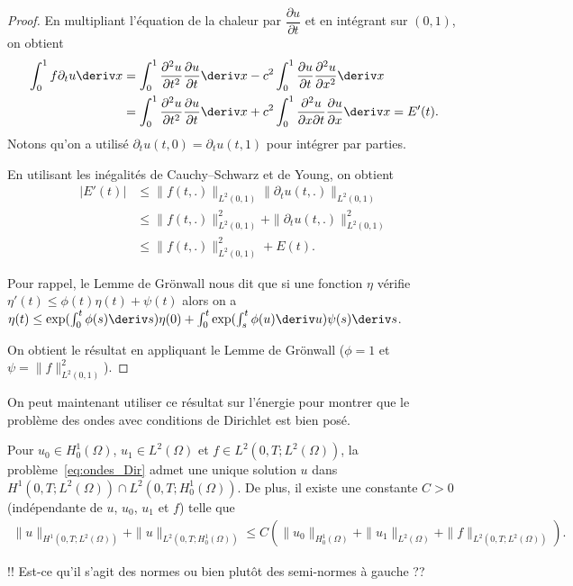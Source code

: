 \documentclass[12pt,a4paper,twoside]{article}
\begin{document}
\begin{proof}
  En multipliant l'\'equation de la chaleur par $\dfrac{\partial u}{\partial t}$
  et en int\'egrant sur $(0,1)$, on obtient
  \begin{align*}
    \int_0^1 f \partial_t u \deriv x
    &=
    \int_0^1 \dfrac{\partial^2 u}{\partial t^2} \dfrac{\partial u}{\partial t} \deriv x
    - c^2 
    \int_0^1 \dfrac{\partial u}{\partial t} \dfrac{\partial^2 u}{\partial x^2} \deriv x
    \\
    &=
    \int_0^1 \dfrac{\partial^2 u}{\partial t^2} \dfrac{\partial u}{\partial t} \deriv x
    + c^2 
    \int_0^1 \dfrac{\partial^2 u}{\partial x \partial t} \dfrac{\partial u}{\partial x} \deriv x
    = E'(t) .
  \end{align*}
  Notons qu'on a utilis\'e $\partial_t u(t,0) = \partial_t u(t,1)$ pour int\'egrer par parties.

  En utilisant les in\'egalit\'es de Cauchy--Schwarz et de Young, on obtient
  \begin{align*}
    | E'(t) |
    &\leq \| f(t,.) \|_{L^2(0,1)} \| \partial_t u(t,.) \|_{L^2(0,1)}
    \\
    &\leq \| f(t,.) \|_{L^2(0,1)}^2 +  \| \partial_t u(t,.) \|_{L^2(0,1)}^2
    \\
    &\leq \| f(t,.) \|_{L^2(0,1)}^2 +  E(t) .
  \end{align*}

  Pour rappel, le Lemme de Gr\"onwall nous dit que si une fonction $\eta$ v\'erifie
  $\eta'(t) \leq \phi(t) \eta(t) + \psi(t)$ alors on a
  $\eta(t) \leq \exp(\int_0^t \phi(s) \deriv s) \eta(0)
  + \int_0^t \exp(\int_s^t \phi(u) \deriv u) \psi(s) \deriv s$.

  On obtient le r\'esultat en appliquant le Lemme de Gr\"onwall
  ($\phi = 1$ et $\psi = \| f \|^2_{L^2(0,1)}$).
\end{proof}

On peut maintenant utiliser ce r\'esultat sur l'\'energie pour montrer
que le probl\`eme des ondes avec conditions de Dirichlet est bien pos\'e.

\begin{proposition}
  \label{prop:ondes_bien_pose}
  Pour $u_0 \in H_0^1(\Omega)$, $u_1 \in L^2(\Omega)$ et $f \in L^2(0,T;L^2(\Omega))$,
  la probl\`eme~\eqref{eq:ondes_Dir} admet une unique solution $u$
  dans $H^1(0,T;L^2(\Omega)) \cap L^2(0,T;H^1_0(\Omega))$.
  De plus, il existe une constante $C > 0$ (ind\'ependante de $u$, $u_0$, $u_1$ et $f$)
  telle que
  \begin{align}
    \label{eq:ondes_donnees}
    \| u \|_{H^1(0,T;L^2(\Omega))} + \| u \|_{L^2(0,T;H^1_0(\Omega))}
    \leq C (\| u_0 \|_{H^1_0(\Omega)} + \| u_1 \|_{L^2(\Omega)} + \| f \|_{L^2(0,T;L^2(\Omega))}) .
  \end{align}

  !! Est-ce qu'il s'agit des normes ou bien plutôt des semi-normes \`a gauche ??
\end{proposition}
\end{document}
